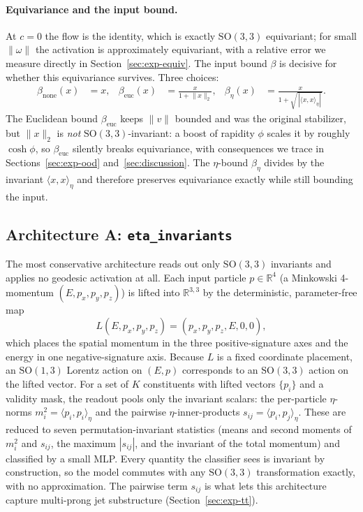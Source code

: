 \documentclass[11pt]{article}
\begin{document}
\paragraph{Equivariance and the input bound.}
At $c = 0$ the flow is the identity, which is exactly $\mathrm{SO}(3,3)$
equivariant; for small $\lVert\omega\rVert$ the activation is
approximately equivariant, with a relative error we measure directly in
Section~\ref{sec:exp-equiv}. The input bound $\beta$ is decisive for
whether this equivariance survives. Three choices:
\begin{align}
  \beta_{\text{none}}(x) &= x, &
  \beta_{\text{euc}}(x) &= \frac{x}{1 + \lVert x\rVert_2}, &
  \beta_{\eta}(x) &= \frac{x}{1 + \sqrt{\,|\langle x,x\rangle_\eta|\,}} .
  \label{eq:bounds}
\end{align}
The Euclidean bound $\beta_{\text{euc}}$ keeps $\lVert v\rVert$ bounded
and was the original stabilizer, but $\lVert x\rVert_2$ is \emph{not}
$\mathrm{SO}(3,3)$-invariant: a boost of rapidity $\phi$ scales it by
roughly $\cosh\phi$, so $\beta_{\text{euc}}$ silently breaks
equivariance, with consequences we trace in
Sections~\ref{sec:exp-ood} and~\ref{sec:discussion}. The $\eta$-bound
$\beta_\eta$ divides by the invariant $\langle x,x\rangle_\eta$ and
therefore preserves equivariance exactly while still bounding the input.

\subsection{Architecture A: \texttt{eta\_invariants}}
\label{sec:method-eta}

The most conservative architecture reads out only $\mathrm{SO}(3,3)$
invariants and applies no geodesic activation at all. Each input particle
$p \in \mathbb{R}^4$ (a Minkowski 4-momentum $(E,p_x,p_y,p_z)$) is lifted
into $\mathbb{R}^{3,3}$ by the deterministic, parameter-free map
\begin{equation}
  L(E, p_x, p_y, p_z) = (p_x, p_y, p_z, E, 0, 0),
  \label{eq:lift}
\end{equation}
which places the spatial momentum in the three positive-signature axes
and the energy in one negative-signature axis. Because $L$ is a fixed
coordinate placement, an $\mathrm{SO}(1,3)$ Lorentz action on $(E,p)$
corresponds to an $\mathrm{SO}(3,3)$ action on the lifted vector. For a
set of $K$ constituents with lifted vectors $\{p_i\}$ and a validity mask,
the readout pools only the invariant scalars: the per-particle
$\eta$-norms $m_i^2 = \langle p_i, p_i\rangle_\eta$ and the pairwise
$\eta$-inner-products $s_{ij} = \langle p_i, p_j\rangle_\eta$. These are
reduced to seven permutation-invariant statistics (means and second
moments of $m_i^2$ and $s_{ij}$, the maximum $|s_{ij}|$, and the
invariant of the total momentum) and classified by a small MLP. Every
quantity the classifier sees is invariant by construction, so the model
commutes with any $\mathrm{SO}(3,3)$ transformation exactly, with no
approximation. The pairwise term $s_{ij}$ is what lets this architecture
capture multi-prong jet substructure (Section~\ref{sec:exp-tt}).
\end{document}

